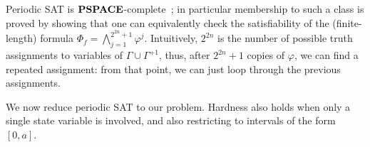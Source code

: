 Periodic SAT is $\textbf{PSPACE}$-complete~\cite{Pap94}; in particular membership to such a class is proved by showing that one can equivalently check the satisfiability of the (finite-length) formula $\Phi_f= \bigwedge_{j= 1}^{2^{2n}+1} \varphi^j$. Intuitively, $2^{2n}$ is the number of possible truth assignments to variables of $\Gamma\cup \Gamma^{+1}$, thus, after $2^{2n}+1$ copies of $\varphi$, we can find a repeated assignment: from that point, we can just loop through the previous assignments. 

We now %
reduce periodic SAT to our problem.
Hardness also holds when only a single state variable is involved, and also restricting to intervals of the form $[0,a]$.


